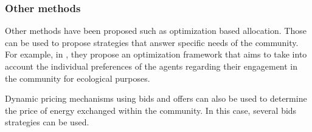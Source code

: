 \subsubsection{Other methods}

Other methods have been proposed such as optimization based allocation. Those can be used to propose strategies that answer specific needs of the community. For example, in \cite{these_new}, they propose an optimization framework that aims to take into account the individual preferences of the agents regarding their engagement in the community for ecological purposes.

Dynamic pricing mechanisms using bids and offers can also be used to determine the price of energy exchanged within the community. In this case, several bids strategies can be used.







